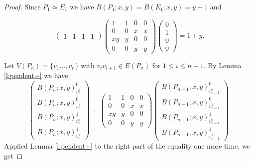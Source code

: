 \documentclass[review]{elsarticle}
\begin{document}
\begin{proof}
Since $P_1 \simeq E_1$ we have $B(P_1;x,y)=B(E_1;x,y)=y+1$
and

 \begin{equation}
\nonumber
 \left(\begin{array}{cccc}1&1&1&1\end{array}\right)
 \left(\begin{array}{cccc} 1 & 1 & 0 & 0 \\ 0 & 0 & x & x \\ xy & y & 0 & 0 \\ 0 & 0 & y & y \end{array}\right)
 \left(\begin{array}{c}0\\1\\0\\0\end{array}\right)=1+y.
 \end{equation}



Let $V(P_n)=\{v_1\ldots,v_n\}$ with $v_{i}v_{i+1} \in E(P_n)$ for $1\le i\le n-1$.
By Lemma \ref{l:pendent+} we have
  \[
 \left(\begin{array}{c} B(P_n;x,y)^{0}_{v^{0}_n} \\ B(P_n;x,y)^{0}_{v^{1}_n} \\ B(P_n;x,y)^{1}_{v^{0}_n} \\ B(P_n;x,y)^{1}_{v^{1}_n} \end{array}\right)
 =
 \left(\begin{array}{cccc} 1 & 1 & 0 & 0 \\ 0 & 0 & x & x \\ xy & y & 0 & 0 \\ 0 & 0 & y & y \end{array}\right)
 \left(\begin{array}{c} B(P_{n-1};x,y)^{0}_{v^{0}_{n-1}} \\ B(P_{n-1};x,y)^{0}_{v^{1}_{n-1}} \\ B(P_{n-1};x,y)^{1}_{v^{0}_{n-1}} \\ B(P_{n-1};x,y)^{1}_{v^{1}_{n-1}} \end{array}\right).
 \]
 Applied Lemma \ref{l:pendent+} to the right part of the equality one more time, we get


\end{proof}
\end{document}
